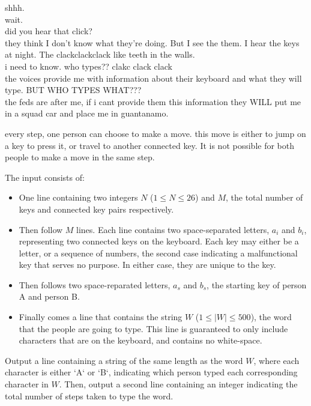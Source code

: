 
\parindent0pt

shhh. \\
wait. \\
did you hear that click? \\
they think I don’t know what they’re doing. But I see the them. I hear the keys
at night. The clackclackclack like teeth in the walls. \\
i need to know. who types?? clakc clack clack \\

the voices provide me with information about their keyboard and what they will
type. BUT WHO TYPES WHAT??? \\
the feds are after me, if i cant provide them this information they WILL put me
in a squad car and place me in guantanamo.

every step, one person can choose to make a move. this move is either to jump on
a key to press it, or travel to another connected key. It is not possible for
both people to make a move in the same step.

\begin{Input}
  The input consists of:
  \begin{itemize}
    \item One line containing two integers $N$ ($1 \leq N \leq 26$) and $M$,
          the total number of keys and connected key pairs respectively.
    \item Then follow $M$ lines. Each line contains two space-separated
          letters, $a_i$ and $b_i$, representing two connected keys on the
          keyboard. Each key may either be a letter, or a sequence of
          numbers, the second case indicating a malfunctional key that
          serves no purpose. In either case, they are unique to the key.
    \item Then follows two space-reparated letters, $a_s$ and $b_s$, the
          starting key of person A and person B.
    \item Finally comes a line that contains the string $W$ ($1 \leq
          |W| \leq 500$), the word that the people are going to type. This
          line is guaranteed to only include characters that are on the
          keyboard, and contains no white-space.
  \end{itemize}
\end{Input}

\begin{Output}
Output a line containing a string of the same length as the word $W$, where each
character is either `A` or `B`, indicating which person typed each corresponding
character in $W$. Then, output a second line containing an integer indicating
the total number of steps taken to type the word.
\end{Output}

